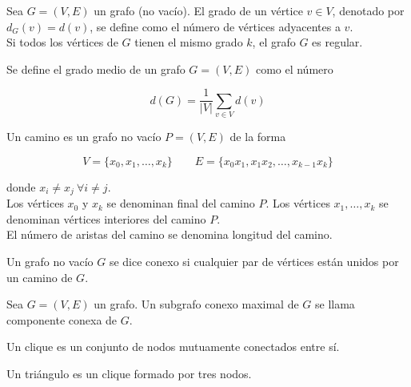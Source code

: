 \begin{defi}
Sea $G = (V,E)$ un grafo (no vacío). El grado de un vértice $v \in V$, denotado por $d_G(v) = d(v)$, se define como el número de vértices adyacentes a $v$.\\

Si todos los vértices de $G$ tienen el mismo grado $k$, el grafo $G$ es regular.
\end{defi}

\begin{defi}
Se define el grado medio de un grafo $G = (V,E)$ como el número

\begin{equation}
d(G) = \dfrac{1}{|V|} \sum_{v \in V} d(v)
\end{equation}
\end{defi}

\begin{defi}
Un camino es un grafo no vacío $P = (V, E)$ de la forma

\begin{equation*}
V = \{ x_0,x_1,\dots,x_k\} \quad \quad E = \{ x_0 x_1, x_1 x_2, \dots, x_{k-1}x_k \}
\end{equation*}

donde $x_i \neq x_j \ \forall i \neq j$.\\

Los vértices $x_0$ y $x_k$ se denominan final del camino $P$. Los vértices $x_1, \dots, x_k$ se denominan vértices interiores del camino $P$.\\

El número de aristas del camino se denomina longitud del camino.
\end{defi}

\begin{defi}
Un grafo no vacío $G$ se dice conexo si cualquier par de vértices están unidos por un camino de $G$.
\end{defi}

\begin{defi}
Sea $G = (V,E)$ un grafo. Un subgrafo conexo maximal de $G$ se llama componente conexa de $G$.
\end{defi}

\begin{defi}
Un clique es un conjunto de nodos mutuamente conectados entre sí.
\end{defi}

\begin{ejemplo}
Un triángulo es un clique formado por tres nodos.
\end{ejemplo}

